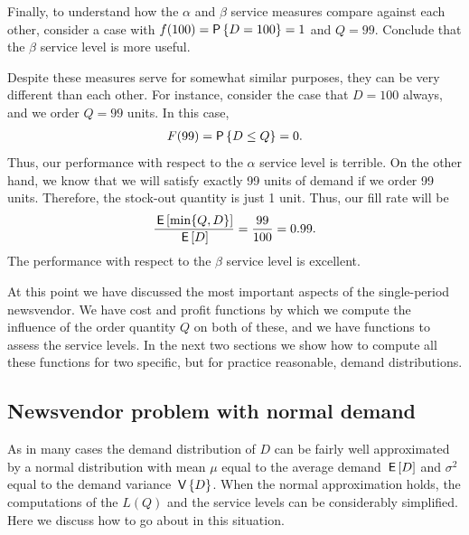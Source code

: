 \begin{exercise}
Finally, to understand how the $\alpha$ and $\beta$ service measures compare against each other, consider a case with $f(100)=\P{D=100}=1$ and $Q=99$. Conclude that the $\beta$ service level is more useful.
\begin{solution}
Despite these measures serve for somewhat similar purposes, they can be very different than each other. For instance, consider the case that $D=100$ always, and we order $Q=99$ units. 
In this case, 
\begin{align*}
F(99) = \P{D\leq Q} = 0.
\end{align*}
Thus, our performance with respect to the $\alpha$ service level is terrible.
On the other hand, we know that we will satisfy exactly 99 units of demand if we order 99 units. Therefore, the stock-out  quantity is just 1 unit. Thus, our fill rate will be 
\begin{align*}
\frac{\,\mathsf{E}\left[\min\{Q,D\}\right]}{\,\mathsf{E}\left[D\right]} = \frac{99}{100} = 0.99.
\end{align*}
The performance with respect to the $\beta$ service level is excellent.
\end{solution}
\end{exercise}

At this point we have discussed the most important aspects of the single-period newsvendor. We have cost and profit functions by which we compute the influence of the order quantity $Q$ on both of these, and we have functions to assess the service levels. In the next two sections we show how to compute all these functions for two specific, but for practice reasonable, demand distributions. 


\subsection{Newsvendor problem with normal demand}

As in many cases the demand distribution of $D$ can be fairly well approximated by a normal distribution with mean $\mu$ equal to the average demand $\,\mathsf{E}\left[D\right]$ and $\sigma^2$ equal to the demand variance $\,\mathsf{V}\left\{D\right\}$. When the normal approximation holds, the computations of the $L(Q)$ and the service levels can be considerably simplified. Here we discuss how to go about in this situation. 


